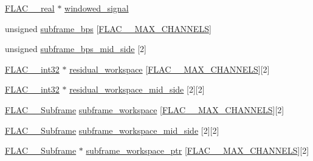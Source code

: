 \begin{DoxyCompactItemize}
\item 
\hyperlink{float_8h_a72409a67c78d2af7d29a9e9362cd49b8}{F\+L\+A\+C\+\_\+\+\_\+real} $\ast$ \hyperlink{struct_f_l_a_c_____stream_encoder_private_af82a14c6dbb468dabc444af86ed8d4cf}{windowed\+\_\+signal}
\item 
unsigned \hyperlink{struct_f_l_a_c_____stream_encoder_private_acd70e4f7d73544a7e3e201b81e1e77ee}{subframe\+\_\+bps} \mbox{[}\hyperlink{group__flac__format_ga488aa5678a58d08f984f5d39185b763d}{F\+L\+A\+C\+\_\+\+\_\+\+M\+A\+X\+\_\+\+C\+H\+A\+N\+N\+E\+LS}\mbox{]}
\item 
unsigned \hyperlink{struct_f_l_a_c_____stream_encoder_private_afb0ea25da76508a1d644ed81bf5cc205}{subframe\+\_\+bps\+\_\+mid\+\_\+side} \mbox{[}2\mbox{]}
\item 
\hyperlink{ordinals_8h_a33fd77bfe6d685541a0c034a75deccdc}{F\+L\+A\+C\+\_\+\+\_\+int32} $\ast$ \hyperlink{struct_f_l_a_c_____stream_encoder_private_adf93a00e0079e396ce2fd535826300ab}{residual\+\_\+workspace} \mbox{[}\hyperlink{group__flac__format_ga488aa5678a58d08f984f5d39185b763d}{F\+L\+A\+C\+\_\+\+\_\+\+M\+A\+X\+\_\+\+C\+H\+A\+N\+N\+E\+LS}\mbox{]}\mbox{[}2\mbox{]}
\item 
\hyperlink{ordinals_8h_a33fd77bfe6d685541a0c034a75deccdc}{F\+L\+A\+C\+\_\+\+\_\+int32} $\ast$ \hyperlink{struct_f_l_a_c_____stream_encoder_private_a02f0fa04f3ac304d61f85fe58fe918ca}{residual\+\_\+workspace\+\_\+mid\+\_\+side} \mbox{[}2\mbox{]}\mbox{[}2\mbox{]}
\item 
\hyperlink{struct_f_l_a_c_____subframe}{F\+L\+A\+C\+\_\+\+\_\+\+Subframe} \hyperlink{struct_f_l_a_c_____stream_encoder_private_a8cde3d683903e4e421f62c10b05a7d14}{subframe\+\_\+workspace} \mbox{[}\hyperlink{group__flac__format_ga488aa5678a58d08f984f5d39185b763d}{F\+L\+A\+C\+\_\+\+\_\+\+M\+A\+X\+\_\+\+C\+H\+A\+N\+N\+E\+LS}\mbox{]}\mbox{[}2\mbox{]}
\item 
\hyperlink{struct_f_l_a_c_____subframe}{F\+L\+A\+C\+\_\+\+\_\+\+Subframe} \hyperlink{struct_f_l_a_c_____stream_encoder_private_a2ac0ca1e308ad41e2c30cb3672949bd2}{subframe\+\_\+workspace\+\_\+mid\+\_\+side} \mbox{[}2\mbox{]}\mbox{[}2\mbox{]}
\item 
\hyperlink{struct_f_l_a_c_____subframe}{F\+L\+A\+C\+\_\+\+\_\+\+Subframe} $\ast$ \hyperlink{struct_f_l_a_c_____stream_encoder_private_ada41d4243204c0e574f54f8886cb55ed}{subframe\+\_\+workspace\+\_\+ptr} \mbox{[}\hyperlink{group__flac__format_ga488aa5678a58d08f984f5d39185b763d}{F\+L\+A\+C\+\_\+\+\_\+\+M\+A\+X\+\_\+\+C\+H\+A\+N\+N\+E\+LS}\mbox{]}\mbox{[}2\mbox{]}
\item 

\end{DoxyCompactItemize}
